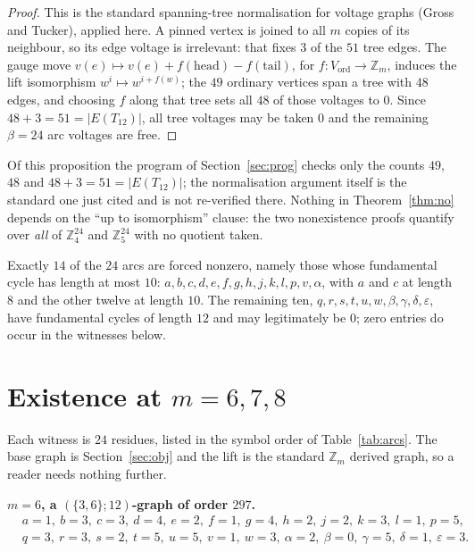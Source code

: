 \documentclass[11pt]{amsart}
\theoremstyle{remark}
\newcommand{\Zm}{\mathbb{Z}_m}
\newcommand{\Tt}{T_{12}}
\begin{document}
\begin{proof}
This is the standard spanning-tree normalisation for voltage graphs (Gross and
Tucker), applied here. A pinned vertex is joined to all $m$ copies of its
neighbour, so its edge voltage is irrelevant: that fixes $3$ of the $51$ tree
edges. The gauge move $v(e) \mapsto v(e) + f(\mathrm{head}) - f(\mathrm{tail})$,
for $f : V_{\mathrm{ord}} \to \Zm$, induces the lift isomorphism
$w^i \mapsto w^{i + f(w)}$; the $49$ ordinary vertices span a tree with $48$
edges, and choosing $f$ along that tree sets all $48$ of those voltages to $0$.
Since $48 + 3 = 51 = |E(\Tt)|$, all tree voltages may be taken $0$ and the
remaining $\beta = 24$ arc voltages are free.
\end{proof}

Of this proposition the program of Section~\ref{sec:prog} checks only the counts
$49$, $48$ and $48+3 = 51 = |E(\Tt)|$; the normalisation argument itself is the
standard one just cited and is not re-verified there. Nothing in
Theorem~\ref{thm:no} depends on the ``up to isomorphism'' clause: the two
nonexistence proofs quantify over \emph{all} of $\mathbb{Z}_4^{24}$ and
$\mathbb{Z}_5^{24}$ with no quotient taken.

Exactly $14$ of the $24$ arcs are forced nonzero, namely those whose
fundamental cycle has length at most $10$: $a, b, c, d, e, f, g, h, j, k, l, p,
v, \alpha$, with $a$ and $c$ at length $8$ and the other twelve at length $10$.
The remaining ten, $q, r, s, t, u, w, \beta, \gamma, \delta, \varepsilon$, have
fundamental cycles of length $12$ and may legitimately be $0$; zero entries do
occur in the witnesses below.

\section{Existence at $m = 6, 7, 8$}\label{sec:yes}

Each witness is $24$ residues, listed in the symbol order of
Table~\ref{tab:arcs}. The base graph is Section~\ref{sec:obj} and the lift is
the standard $\Zm$ derived graph, so a reader needs nothing further.

\medskip
\noindent\textbf{$m = 6$, a $(\{3,6\};12)$-graph of order $297$.}
\[
\begin{aligned}
&a{=}1,\ b{=}3,\ c{=}3,\ d{=}4,\ e{=}2,\ f{=}1,\ g{=}4,\ h{=}2,
 \ j{=}2,\ k{=}3,\ l{=}1,\ p{=}5,\\
&q{=}3,\ r{=}3,\ s{=}2,\ t{=}5,\ u{=}5,\ v{=}1,\ w{=}3,\ \alpha{=}2,
 \ \beta{=}0,\ \gamma{=}5,\ \delta{=}1,\ \varepsilon{=}3.
\end{aligned}
\]
\end{document}
